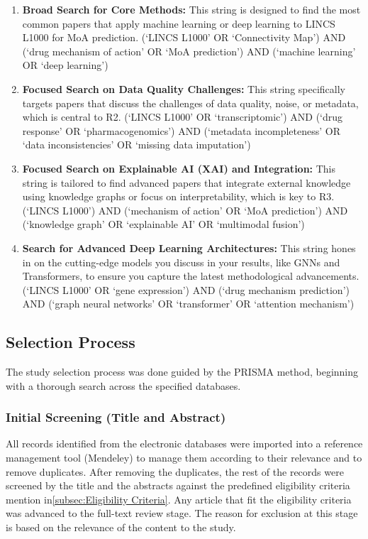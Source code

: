 \documentclass[twocolumn]{article}
\begin{document}
\begin{enumerate}
    \item \textbf{Broad Search for Core Methods:} This string is designed to find the most common papers that apply machine learning or deep learning to LINCS L1000 for MoA prediction.
    (`LINCS L1000' OR `Connectivity Map') AND (`drug mechanism of action' OR `MoA prediction') AND (`machine learning' OR `deep learning')
    \item \textbf{Focused Search on Data Quality Challenges:} This string specifically targets papers that discuss the challenges of data quality, noise, or metadata, which is central to R2.
    (`LINCS L1000' OR `transcriptomic') AND (`drug response' OR `pharmacogenomics') AND (`metadata incompleteness' OR `data inconsistencies' OR `missing data imputation')
    \item \textbf{Focused Search on Explainable AI (XAI) and Integration:} This string is tailored to find advanced papers that integrate external knowledge using knowledge graphs or focus on interpretability, which is key to R3.
    (`LINCS L1000') AND (`mechanism of action' OR `MoA prediction') AND (`knowledge graph' OR `explainable AI' OR `multimodal fusion')
    \item \textbf{Search for Advanced Deep Learning Architectures:} This string hones in on the cutting-edge models you discuss in your results, like GNNs and Transformers, to ensure you capture the latest methodological advancements.
    (`LINCS L1000' OR `gene expression') AND (`drug mechanism prediction') AND (`graph neural networks' OR `transformer' OR `attention mechanism')
\end{enumerate}

\subsection{Selection Process}
The study selection process was done guided by the PRISMA method, beginning with a thorough search across the specified databases.
\\
\subsubsection{Initial Screening (Title and Abstract)}
All records identified from the electronic databases were imported into a reference management tool (Mendeley) to manage them according to their relevance and to remove duplicates. After removing the duplicates, the rest of the records were screened by the title and the abstracts against the predefined eligibility criteria mention in\ref{subsec:Eligibility Criteria}. Any article that fit the eligibility criteria was advanced to the full-text review stage. The reason for exclusion at this stage is based on the relevance of the content to the study.
\end{document}
